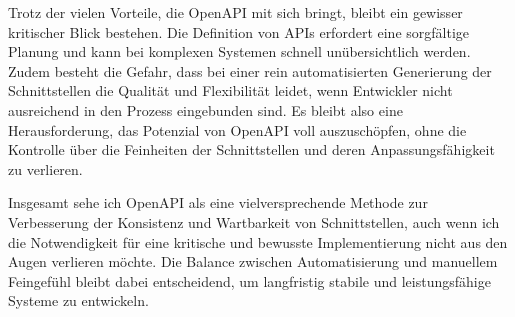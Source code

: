 Trotz der vielen Vorteile, die OpenAPI mit sich bringt, bleibt ein gewisser kritischer Blick bestehen. 
Die Definition von APIs erfordert eine sorgfältige Planung und kann bei komplexen Systemen schnell unübersichtlich werden.
Zudem besteht die Gefahr, dass bei einer rein automatisierten Generierung der Schnittstellen die Qualität und Flexibilität leidet,
wenn Entwickler nicht ausreichend in den Prozess eingebunden sind. 
Es bleibt also eine Herausforderung, das Potenzial von OpenAPI voll auszuschöpfen, 
ohne die Kontrolle über die Feinheiten der Schnittstellen und deren Anpassungsfähigkeit zu verlieren.

Insgesamt sehe ich OpenAPI als eine vielversprechende Methode zur Verbesserung der Konsistenz und Wartbarkeit von Schnittstellen,
auch wenn ich die Notwendigkeit für eine kritische und bewusste Implementierung nicht aus den Augen verlieren möchte. 
Die Balance zwischen Automatisierung und manuellem Feingefühl bleibt dabei entscheidend,
um langfristig stabile und leistungsfähige Systeme zu entwickeln.
